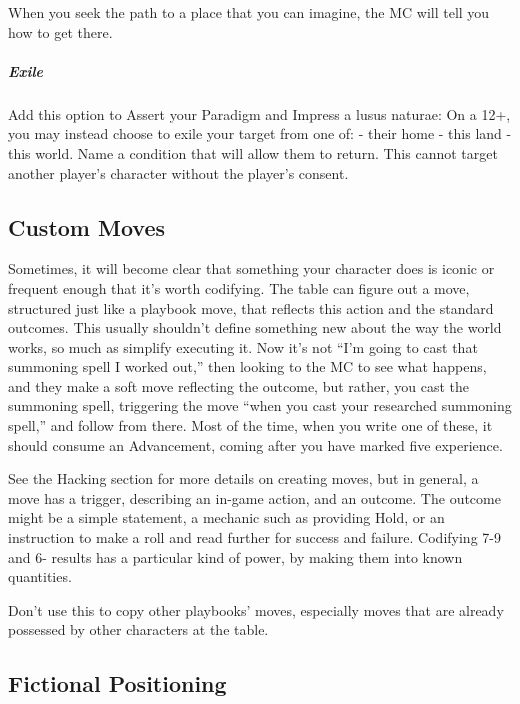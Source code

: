 \documentclass[
]{article}
\begin{document}
When you seek the path to a place that you can imagine, the MC will tell
you how to get there.

\hypertarget{exile}{%
\subparagraph{Exile}\label{exile}}

Add this option to Assert your Paradigm and Impress a lusus naturae: On
a 12+, you may instead choose to exile your target from one of: - their
home - this land - this world. Name a condition that will allow them to
return. This cannot target another player's character without the
player's consent.

\hypertarget{custom-moves}{%
\subsection{Custom Moves}\label{custom-moves}}

Sometimes, it will become clear that something your character does is
iconic or frequent enough that it's worth codifying. The table can
figure out a move, structured just like a playbook move, that reflects
this action and the standard outcomes. This usually shouldn't define
something new about the way the world works, so much as simplify
executing it. Now it's not ``I'm going to cast that summoning spell I
worked out,'' then looking to the MC to see what happens, and they make
a soft move reflecting the outcome, but rather, you cast the summoning
spell, triggering the move ``when you cast your researched summoning
spell,'' and follow from there. Most of the time, when you write one of
these, it should consume an Advancement, coming after you have marked
five experience.

See the Hacking section for more details on creating moves, but in
general, a move has a trigger, describing an in-game action, and an
outcome. The outcome might be a simple statement, a mechanic such as
providing Hold, or an instruction to make a roll and read further for
success and failure. Codifying 7-9 and 6- results has a particular kind
of power, by making them into known quantities.

Don't use this to copy other playbooks' moves, especially moves that are
already possessed by other characters at the table.

\hypertarget{fictional-positioning}{%
\subsection{Fictional Positioning}\label{fictional-positioning}}
\end{document}
